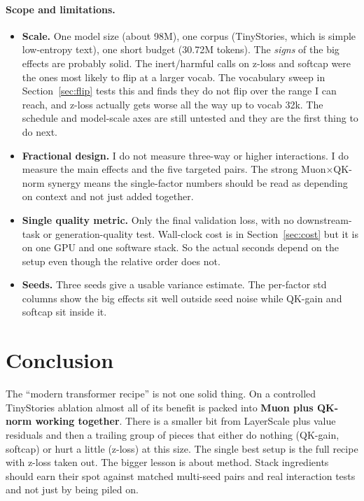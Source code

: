 \documentclass[11pt]{article}
\begin{document}
\paragraph{Scope and limitations.}
\begin{itemize}
  \item \textbf{Scale.} One model size (about 98M), one corpus (TinyStories, which is simple low-entropy text), one short budget (30.72M tokens). The \emph{signs} of the big effects are probably solid. The inert/harmful calls on z-loss and softcap were the ones most likely to flip at a larger vocab. The vocabulary sweep in Section~\ref{sec:flip} tests this and finds they do not flip over the range I can reach, and z-loss actually gets worse all the way up to vocab 32k. The schedule and model-scale axes are still untested and they are the first thing to do next.
  \item \textbf{Fractional design.} I do not measure three-way or higher interactions. I do measure the main effects and the five targeted pairs. The strong Muon$\times$QK-norm synergy means the single-factor numbers should be read as depending on context and not just added together.
  \item \textbf{Single quality metric.} Only the final validation loss, with no downstream-task or generation-quality test. Wall-clock cost is in Section~\ref{sec:cost} but it is on one GPU and one software stack. So the actual seconds depend on the setup even though the relative order does not.
  \item \textbf{Seeds.} Three seeds give a usable variance estimate. The per-factor std columns show the big effects sit well outside seed noise while QK-gain and softcap sit inside it.
\end{itemize}

\section{Conclusion}

The ``modern transformer recipe'' is not one solid thing. On a controlled
TinyStories ablation almost all of its benefit is packed into \textbf{Muon plus
QK-norm working together}. There is a smaller bit from LayerScale plus value
residuals and then a trailing group of pieces that either do nothing (QK-gain,
softcap) or hurt a little (z-loss) at this size. The single best setup is the full
recipe with z-loss taken out. The bigger lesson is about method. Stack ingredients
should earn their spot against matched multi-seed pairs and real interaction tests
and not just by being piled on.
\end{document}
